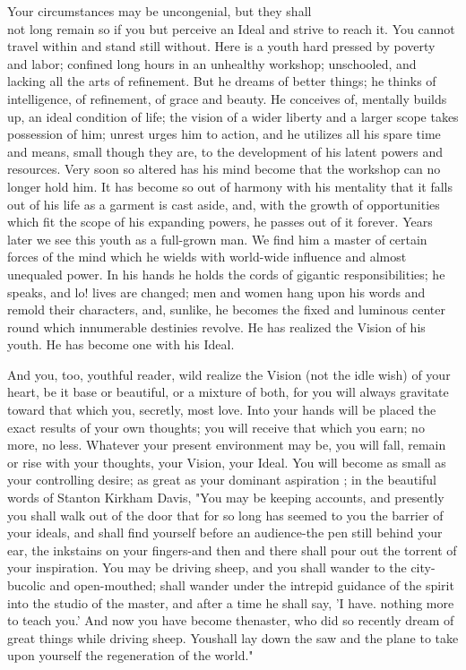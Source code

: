 \documentclass[10pt]{article}
\begin{document}
Your circumstances may be uncongenial, but they shall\\
not long remain so if you but perceive an Ideal and strive to reach it. You cannot travel within and stand still without. Here is a youth hard pressed by poverty and labor; confined long hours in an unhealthy workshop; unschooled, and lacking all the arts of refinement. But he dreams of better things; he thinks of intelligence, of refinement, of grace and beauty. He conceives of, mentally builds up, an ideal condition of life; the vision of a wider liberty and a larger scope takes possession of him; unrest urges him to action, and he utilizes all his spare time and means, small though they are, to the development of his latent powers and resources. Very soon so altered has his mind become that the workshop can no longer hold him. It has become so out of harmony with his mentality that it falls out of his life as a garment is cast aside, and, with the growth of opportunities which fit the scope of his expanding powers, he passes out of it forever. Years later we see this youth as a full-grown man. We find him a master of certain forces of the mind which he wields with world-wide influence and almost unequaled power. In his hands he holds the cords of gigantic responsibilities; he speaks, and lo! lives are changed; men and women hang upon his words and remold their characters, and, sunlike, he becomes the fixed and luminous center round which innumerable destinies revolve. He has realized the Vision of his youth. He has become one with his Ideal.

And you, too, youthful reader, wild realize the Vision (not the idle wish) of your heart, be it base or beautiful, or a mixture of both, for you will always gravitate toward that which you, secretly, most love. Into your hands will be placed the exact results of your own thoughts; you will receive that which you earn; no more, no less. Whatever your present environment may be, you will fall, remain or rise with your thoughts, your Vision, your Ideal. You will become as small as your controlling desire; as great as your dominant aspiration ; in the beautiful words of Stanton Kirkham Davis, "You may be keeping accounts, and presently\\
you shall walk out of the door that for so long has seemed to you the barrier of your ideals, and shall find yourself before an audience-the pen still behind your ear, the inkstains on your fingers-and then and there shall pour out the torrent of your inspiration. You may be driving sheep, and you shall wander to the city-bucolic and open-mouthed; shall wander under the intrepid guidance of the spirit into the studio of the master, and after a time he shall say, 'I have. nothing more to teach you.' And now you have become thenaster, who did so recently dream of great things while driving sheep. Youshall lay down the saw and the plane to take upon yourself the regeneration of the world."
\end{document}

